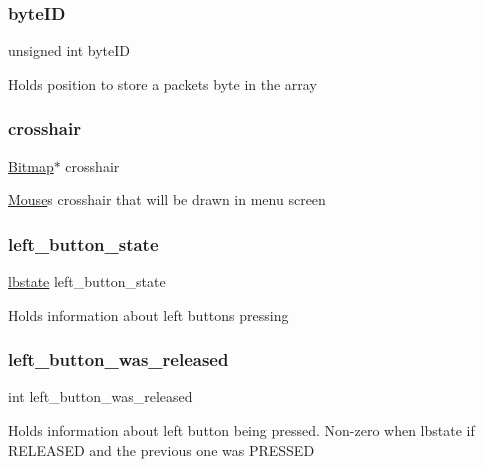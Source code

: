 \subsubsection{\texorpdfstring{byte\+ID}{byteID}}
{\footnotesize\ttfamily unsigned int byte\+ID}

Holds position to store a packet\textquotesingle{}s byte in the array \hypertarget{struct_mouse_a6d9b94480453acd797d61e51453ff026}{}\label{struct_mouse_a6d9b94480453acd797d61e51453ff026} 
\subsubsection{\texorpdfstring{crosshair}{crosshair}}
{\footnotesize\ttfamily \hyperlink{struct_bitmap}{Bitmap}$\ast$ crosshair}

\hyperlink{struct_mouse}{Mouse}\textquotesingle{}s crosshair that will be drawn in menu screen \hypertarget{struct_mouse_a3460dc9908f5759debb0d94ccd939eb0}{}\label{struct_mouse_a3460dc9908f5759debb0d94ccd939eb0} 
\subsubsection{\texorpdfstring{left\+\_\+button\+\_\+state}{left\_button\_state}}
{\footnotesize\ttfamily \hyperlink{group__mouse_gaab5a16f4c5c371d5048e7a729a8b45c7}{lbstate} left\+\_\+button\+\_\+state}

Holds information about left button\textquotesingle{}s pressing \hypertarget{struct_mouse_a0fc78a583cf4573ff7df06591ac3b4ef}{}\label{struct_mouse_a0fc78a583cf4573ff7df06591ac3b4ef} 
\subsubsection{\texorpdfstring{left\+\_\+button\+\_\+was\+\_\+released}{left\_button\_was\_released}}
{\footnotesize\ttfamily int left\+\_\+button\+\_\+was\+\_\+released}

Holds information about left button being pressed. Non-\/zero when lbstate if R\+E\+L\+E\+A\+S\+ED and the previous one was P\+R\+E\+S\+S\+ED \hypertarget{struct_mouse_a1d1878244696a8be772aa71772c33f0a}{}\label{struct_mouse_a1d1878244696a8be772aa71772c33f0a} 
